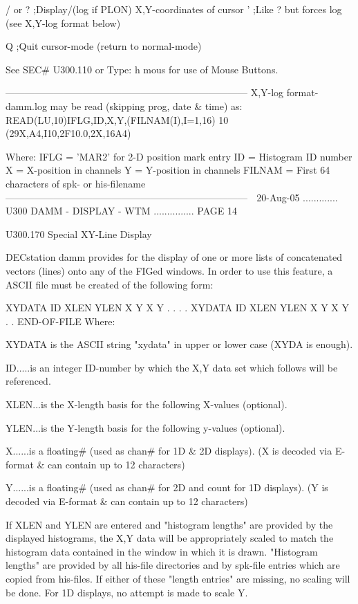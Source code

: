    / or ? ;Display/(log if PLON)  X,Y-coordinates of cursor
   '      ;Like ? but forces log (see X,Y-log format below)
 
   Q      ;Quit cursor-mode (return to normal-mode)
 
   See SEC# U300.110 or Type: h mous for use of Mouse Buttons.
 
   ---------------------------------------------------------------------------
   X,Y-log format- damm.log may be read (skipping prog, date & time) as:
          READ(LU,10)IFLG,ID,X,Y,(FILNAM(I),I=1,16)
       10 (29X,A4,I10,2F10.0,2X,16A4)
 
   Where: IFLG   = 'MAR2' for 2-D position mark entry
          ID     = Histogram ID number
          X      = X-position in channels
          Y      = Y-position in channels
          FILNAM = First 64 characters of spk- or his-filename
   ---------------------------------------------------------------------------
    
   20-Aug-05 ............. U300  DAMM - DISPLAY - WTM ............... PAGE  14
 
 
 
   U300.170  Special XY-Line Display
 
   DECstation  damm  provides  for  the  display  of  one  or  more  lists  of
   concatenated vectors (lines) onto any of the FIGed  windows.  In  order  to
   use this feature, a ASCII file must be created of the following form:
 
 
   XYDATA  ID  XLEN  YLEN
   X Y
   X Y
   . .
   . .
   XYDATA  ID  XLEN  YLEN
   X Y
   X Y
   . .
   END-OF-FILE     Where:
 
 
   XYDATA  is  the  ASCII  string  "xydata"  in  upper  or lower case (XYDA is
          enough).
 
   ID.....is an integer ID-number by which the  X,Y  data  set  which  follows
          will be referenced.
 
   XLEN...is the X-length basis for the following X-values (optional).
 
   YLEN...is the Y-length basis for the following y-values (optional).
 
   X......is a floating# (used as chan# for 1D & 2D displays).
          (X is decoded via E-format & can contain up to 12 characters)
 
   Y......is a floating# (used as chan# for 2D and count for 1D displays).
          (Y is decoded via E-format & can contain up to 12 characters)
 
 
   If  XLEN  and  YLEN are entered and "histogram lengths" are provided by the
   displayed histograms, the X,Y data will be appropriately  scaled  to  match
   the  histogram  data  contained  in  the  window  in  which  it  is  drawn.
   "Histogram lengths"  are  provided  by  all  his-file  directories  and  by
   spk-file  entries  which  are  copied  from  his-files.  If either of these
   "length entries" are missing, no scaling will be done. For 1D displays,  no
   attempt is made to scale Y.
 
